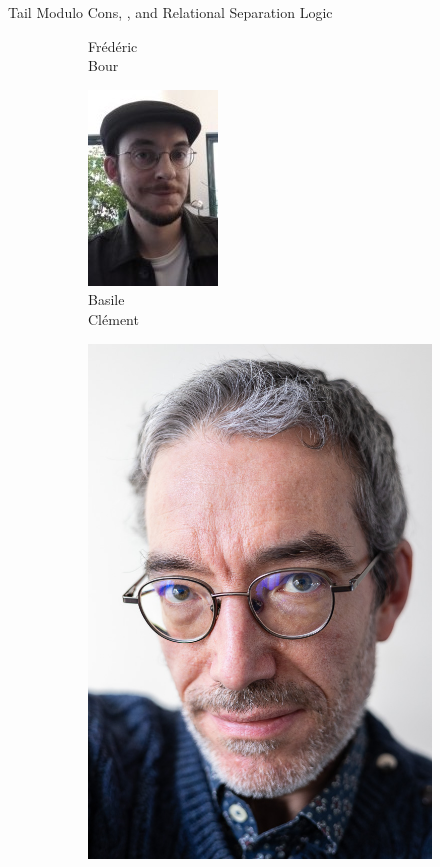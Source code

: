 \begin{frame}{Tail Modulo Cons, \OCaml, and Relational Separation Logic}
\begin{figure}
\begin{subfigure}[b]{0.16\textwidth}
    \caption*{\footnotesize Frédéric \\ Bour}
  \end{subfigure}
  \begin{subfigure}[b]{0.16\textwidth}
    \includegraphics[scale=0.4]{images/basile_clement.jpg}
    \caption*{\footnotesize Basile \\ Clément}
  \end{subfigure}
  \begin{subfigure}[b]{0.16\textwidth}
    \includegraphics[scale=0.078]{images/francois_pottier.jpg}

\end{subfigure}
\end{figure}
\end{frame}

